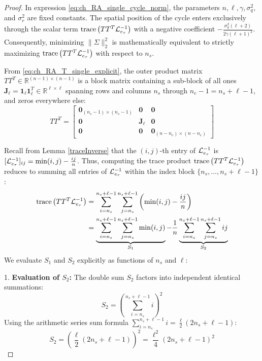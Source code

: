 \begin{proof}
In expression \eqref{eq:ch_RA_single_cycle_norm}, the parameters $n, \ell, \gamma, \sigma_q^2,$ and $\sigma_r^2$ are fixed constants. The spatial position of the cycle enters exclusively through the scalar term $\text{trace}\left( T T^T \mathcal{L}_{e_{\tau}}^{-1} \right)$ with a negative coefficient $-\frac{\sigma_q^2(\ell+2)}{2\gamma(\ell+1)^2}$. Consequently, minimizing $\|\Sigma\|_2^2$ is mathematically equivalent to strictly maximizing $\text{trace}\left( T T^T \mathcal{L}_{e_{\tau}}^{-1} \right)$ with respect to $n_s$.

From \eqref{eq:ch_RA_T_single_explicit}, the outer product matrix $T T^T \in \mathbb{R}^{(n-1) \times (n-1)}$ is a block matrix containing a sub-block of all ones $\mathbf{J}_\ell = \mathbf{1}_\ell \mathbf{1}_\ell^T \in \mathbb{R}^{\ell \times \ell}$ spanning rows and columns $n_s$ through $n_e-1 = n_s + \ell - 1$, and zeros everywhere else:
\begin{equation}
	T T^T = \begin{bmatrix} \mathbf{0}_{(n_s-1) \times (n_s-1)} & \mathbf{0} & \mathbf{0} \\ \mathbf{0} & \mathbf{J}_\ell & \mathbf{0} \\ \mathbf{0} & \mathbf{0} & \mathbf{0}_{(n-n_e) \times (n-n_e)} \end{bmatrix}
\end{equation}

Recall from Lemma \ref{traceInverse} that the $(i,j)$-th entry of $\mathcal{L}_{e_{\tau}}^{-1}$ is $[\mathcal{L}_{e_{\tau}}^{-1}]_{ij} = \min(i,j) - \frac{i j}{n}$. Thus, computing the trace product $\text{trace}\left( T T^T \mathcal{L}_{e_{\tau}}^{-1} \right)$ reduces to summing all entries of $\mathcal{L}_{e_{\tau}}^{-1}$ within the index block $\{n_s, \dots, n_s + \ell - 1\}$:
\begin{align}\label{eq:ch_RA_double_sum_def}
	\text{trace}\left( T T^T \mathcal{L}_{e_{\tau}}^{-1} \right) &= \sum_{i=n_s}^{n_s+\ell-1} \sum_{j=n_s}^{n_s+\ell-1} \left( \min(i,j) - \frac{i j}{n} \right) \\
	&= \underbrace{\sum_{i=n_s}^{n_s+\ell-1} \sum_{j=n_s}^{n_s+\ell-1} \min(i,j)}_{S_1} - \frac{1}{n} \underbrace{\sum_{i=n_s}^{n_s+\ell-1} \sum_{j=n_s}^{n_s+\ell-1} i j}_{S_2} \nonumber
\end{align}
We evaluate $S_1$ and $S_2$ explicitly as functions of $n_s$ and $\ell$:

1. \textbf{Evaluation of $S_2$:} The double sum $S_2$ factors into independent identical summations:
\begin{equation}
	S_2 = \left( \sum_{i=n_s}^{n_s+\ell-1} i \right)^2
\end{equation}
Using the arithmetic series sum formula $\sum_{i=n_s}^{n_s+\ell-1} i = \frac{\ell}{2} (2n_s + \ell - 1)$:
\begin{equation}\label{eq:ch_RA_S2_eval}
	S_2 = \left( \frac{\ell}{2} (2n_s + \ell - 1) \right)^2 = \frac{\ell^2}{4} (2n_s + \ell - 1)^2
\end{equation}


\end{proof}
